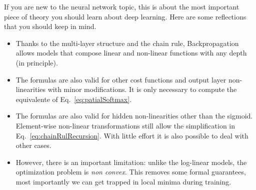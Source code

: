 If you are new to the neural network topic, this is about the most important
piece of theory you should learn about deep learning. Here are some reflections
that you should keep in mind.

\begin{itemize}
\item Thanks to the multi-layer structure and the chain rule, Backpropagation allows models that compose linear and non-linear functions with any depth (in principle\footnotemark). 

\item The formulas are also valid for other cost functions and output layer non-linearities with minor modifications. It is only necessary to compute the equivalente of Eq.~\ref{eq:patialSoftmax}. 

\item The formulas are also valid for hidden non-linearities other than the sigmoid. Element-wise non-linear transformations still allow the simplification in Eq.~\ref{eq:chainRulRecursion}. With little effort it is also possible to deal with other cases.

\item However, there is an important limitation: unlike the log-linear models, the optimization problem is \textit{non convex}. This removes some formal guarantees, most importantly we can get trapped in local minima during training.
\end{itemize}


%
%
%

